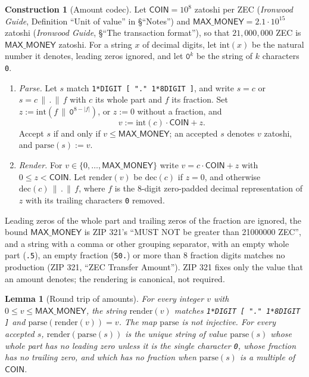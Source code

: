 \documentclass[11pt,a4paper]{article}
\newtheorem{lemma}[theorem]{Lemma}
\theoremstyle{definition}
\newtheorem{construction}[theorem]{Construction}
\begin{document}
\begin{construction}[Amount codec]\label{def:zip321-amount}
Let $\mathsf{COIN} = 10^8$ zatoshi per ZEC (\emph{Ironwood Guide},
Definition ``Unit of value'' in \S``Notes'') and $\mathsf{MAX\_MONEY} = 2.1
\cdot 10^{15}$ zatoshi (\emph{Ironwood Guide}, \S``The transaction
format''), so that $21{,}000{,}000$ ZEC is $\mathsf{MAX\_MONEY}$ zatoshi.
For a string $x$ of decimal digits, let $\mathrm{int}(x)$ be the natural
number it denotes, leading zeros ignored, and let $\mathtt{0}^k$ be the
string of $k$ characters \texttt{0}.
\begin{enumerate}[label=(\arabic*)]
\item \emph{Parse.} Let $s$ match \texttt{1*DIGIT [ "." 1*8DIGIT ]}, and
  write $s = c$ or $s = c \,\|\, \texttt{.} \,\|\, f$ with $c$ its whole
  part and $f$ its fraction. Set $z := \mathrm{int}(f \,\|\,
  \mathtt{0}^{8-|f|})$, or $z := 0$ without a fraction, and
  \[
    v := \mathrm{int}(c) \cdot \mathsf{COIN} + z .
  \]
  Accept $s$ if and only if $v \le \mathsf{MAX\_MONEY}$; an accepted $s$
  denotes $v$ zatoshi, and $\mathrm{parse}(s) := v$.
\item \emph{Render.} For $v \in \{0, \dots, \mathsf{MAX\_MONEY}\}$ write
  $v = c \cdot \mathsf{COIN} + z$ with $0 \le z < \mathsf{COIN}$. Let
  $\mathrm{render}(v)$ be $\mathrm{dec}(c)$ if $z = 0$, and otherwise
  $\mathrm{dec}(c) \,\|\, \texttt{.} \,\|\, f$, where $f$ is the
  $8$-digit zero-padded decimal representation of $z$ with its trailing
  characters \texttt{0} removed.
\end{enumerate}
Leading zeros of the whole part and trailing zeros of the fraction are
ignored, the bound $\mathsf{MAX\_MONEY}$ is ZIP 321's ``MUST NOT be greater
than 21000000 ZEC'', and a string with a comma or other grouping separator,
with an empty whole part (\texttt{.5}), an empty fraction (\texttt{50.}) or
more than $8$ fraction digits matches no production (ZIP 321, ``ZEC
Transfer Amount''). ZIP 321 fixes only the value that an amount denotes;
the rendering is canonical, not required.
\end{construction}

\begin{lemma}[Round trip of amounts]\label{lem:zip321-amount}
For every integer $v$ with $0 \le v \le \mathsf{MAX\_MONEY}$, the string
$\mathrm{render}(v)$ matches \texttt{1*DIGIT [ "." 1*8DIGIT ]} and
$\mathrm{parse}(\mathrm{render}(v)) = v$. The map $\mathrm{parse}$ is not
injective. For every accepted $s$, $\mathrm{render}(\mathrm{parse}(s))$ is
the unique string of value $\mathrm{parse}(s)$ whose whole part has no
leading zero unless it is the single character \texttt{0}, whose fraction
has no trailing zero, and which has no fraction when $\mathrm{parse}(s)$ is
a multiple of $\mathsf{COIN}$.
\end{lemma}
\end{document}
